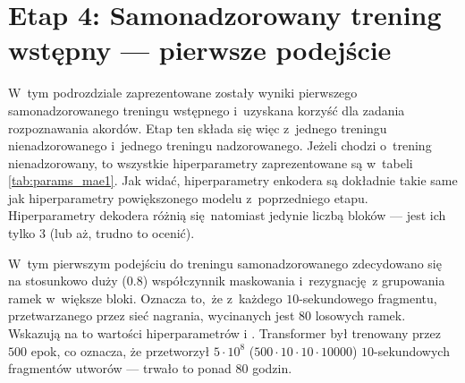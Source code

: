 \section{Etap 4: Samonadzorowany trening wstępny --- pierwsze podejście}

W~tym podrozdziale zaprezentowane zostały wyniki pierwszego samonadzorowanego treningu wstępnego i~uzyskana korzyść dla zadania rozpoznawania akordów. Etap ten składa się więc z~jednego treningu nienadzorowanego i~jednego treningu nadzorowanego. Jeżeli chodzi o~trening nienadzorowany, to wszystkie hiperparametry zaprezentowane są w~tabeli \ref{tab:params_mae1}. Jak widać, hiperparametry enkodera są dokładnie takie same jak hiperparametry powiększonego modelu z~poprzedniego etapu. Hiperparametry dekodera różnią się natomiast jedynie liczbą bloków --- jest ich tylko $3$ (lub aż, trudno to ocenić). 

W~tym pierwszym podejściu do treningu samonadzorowanego zdecydowano się na stosunkowo duży ($0.8$) współczynnik maskowania i~rezygnację z grupowania ramek w~większe bloki. Oznacza to, że z~każdego $10$-sekundowego fragmentu, przetwarzanego przez sieć nagrania, wycinanych jest $80$ losowych ramek. Wskazują na to wartości hiperparametrów   i . Transformer był trenowany przez $500$ epok, co oznacza, że przetworzył $5 \cdot 10^8$ ($500 \cdot 10 \cdot 10 \cdot 10000$) $10$-sekundowych fragmentów utworów --- trwało to ponad $80$ godzin.

